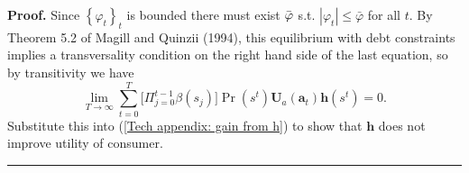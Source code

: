 \documentclass[thmsb,11pt]{article}
\newenvironment{proof}[1][Proof]{\noindent \textbf{#1.} }{\  \rule{0.5em}{0.5em}}
\begin{document}
\begin{proof}
Since $\left\{ \varphi _{t}\right\} _{t}$ is bounded there must exist $\bar{%
\varphi}$ s.t. $|\varphi _{t}|\leq \bar{\varphi}$ for all $t$. By Theorem
5.2 of Magill and Quinzii (1994), this equilibrium with debt constraints
implies a transversality condition on the right hand side of the last
equation, so by transitivity we have%
\begin{equation*}
\lim_{T\rightarrow \infty }\sum_{t=0}^{T}\bigl[\Pi_{j=0}^{t-1} \beta(s_j)\bigr]\Pr \left( s^{t}\right)
\bm{U}_{a}(\bm{a}_{t})\bm{h}\left( s^{t}\right) =0.
\end{equation*}%
Substitute this into (\ref{Tech appendix: gain from h}) to show that $%
\bm{h}$ does not improve utility of consumer.
\end{proof}

\smallskip
% 
% 
% 
% 
% 
% 
\end{document}
